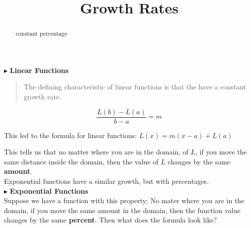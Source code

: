 \documentclass{ximera}
\title{Growth Rates}
\begin{document}
\begin{abstract}
constant percentage
\end{abstract}
\maketitle










$\blacktriangleright$ \textbf{\textcolor{purple!85!blue}{Linear Functions}}   \\


\begin{quote}
The defining characteristic of linear functions is that the have a constant growth rate.
\end{quote}





\[   \frac{L(b)-L(a)}{b-a} = m       \]

This led to the formula for linear functions:  $L(x) = m(x-a) + L(a)$


This tells us that no matter where you are in the domain, of $L$, if you move the same distance inside the domain, then the value of $L$ changes by the same \textbf{\textcolor{purple!85!blue}{amount}}. \\


Exponential functions have a similar growth, but with percentages. \\



$\blacktriangleright$ \textbf{\textcolor{purple!85!blue}{Exponential Functions}} \\



Suppose we have a function with this property:  No mater where you are in the domain, if you move the same amount in the domain, then the function value changes by the same \textbf{\textcolor{purple!85!blue}{percent}}.  Then what does the formula look like?
\end{document}
